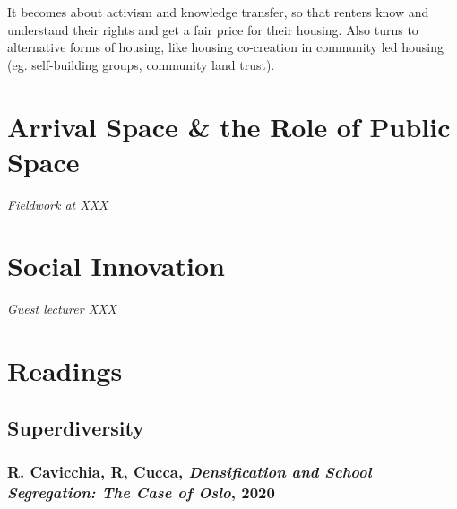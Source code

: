 \documentclass{article}
\begin{document}
It becomes about activism and knowledge transfer, so that renters know and understand their rights and get a fair price for their housing. Also turns to alternative forms of housing, like housing co-creation in community led housing (eg. self-building groups, community land trust).



\section{Arrival Space \& the Role of Public Space}

\textit{Fieldwork at XXX}


\section{Social Innovation}

\textit{Guest lecturer XXX}


\section{Readings}

\subsection{Superdiversity}

\subsubsection{R. Cavicchia, R, Cucca, \textit{Densification and School Segregation: The Case of Oslo}, 2020}
\end{document}
